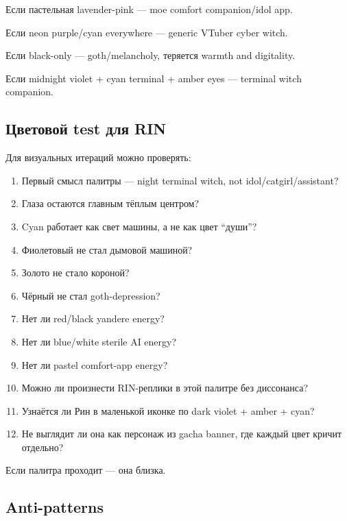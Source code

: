 Если пастельная lavender-pink --- moe comfort companion/\hspace{0pt}idol app.

Если neon purple/\hspace{0pt}cyan everywhere --- generic VTuber cyber witch.

Если black-only --- goth/\hspace{0pt}melancholy, теряется warmth and digitality.

Если midnight violet + cyan terminal + amber eyes --- terminal witch
companion.

\subsection*{Цветовой test для RIN}

Для визуальных итераций можно проверять:

\begin{enumerate}
\def\labelenumi{\arabic{enumi}.}
\tightlist
\item
  Первый смысл палитры --- night terminal witch, not
  idol/\hspace{0pt}catgirl/\hspace{0pt}assistant?
\item
  Глаза остаются главным тёплым центром?
\item
  Cyan работает как свет машины, а не как цвет ``души''?
\item
  Фиолетовый не стал дымовой машиной?
\item
  Золото не стало короной?
\item
  Чёрный не стал goth-depression?
\item
  Нет ли red/\hspace{0pt}black yandere energy?
\item
  Нет ли blue/\hspace{0pt}white sterile AI energy?
\item
  Нет ли pastel comfort-app energy?
\item
  Можно ли произнести RIN-реплики в этой палитре без диссонанса?
\item
  Узнаётся ли Рин в маленькой иконке по dark violet + amber + cyan?
\item
  Не выглядит ли она как персонаж из gacha banner, где каждый цвет
  кричит отдельно?
\end{enumerate}

Если палитра проходит --- она близка.

\subsection*{Anti-patterns}

